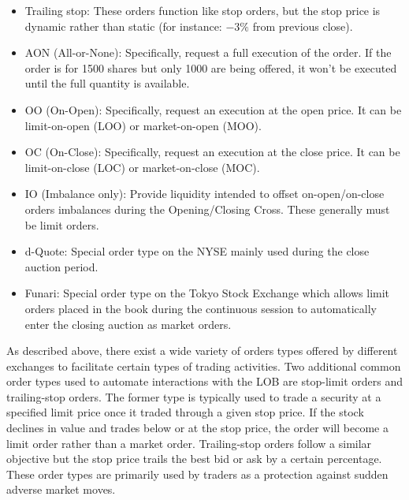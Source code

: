 \begin{itemize}
\item  Trailing stop: These orders function like stop orders, but the stop price is dynamic rather than static (for instance: $-3\%$ from previous close).

\item  AON (All-or-None): Specifically, request a full execution of the order. If the order is for 1500 shares but only 1000 are being offered, it won't be executed until the full quantity is available.

\item  OO (On-Open): Specifically, request an execution at the open price. It can be limit-on-open (LOO) or market-on-open (MOO).

\item  OC (On-Close): Specifically, request an execution at the close price. It can be limit-on-close (LOC) or market-on-close (MOC).

\item  IO (Imbalance only): Provide liquidity intended to offset on-open/on-close orders imbalances during the Opening/Closing Cross. These generally must be limit orders.

\item  d-Quote: Special order type on the NYSE mainly used during the close auction period.

\item  Funari: Special order type on the Tokyo Stock Exchange which allows limit orders placed in the book during the continuous session to automatically enter the closing auction as market orders. \\
\end{itemize} 




As described above, there exist a wide variety of orders types offered by different exchanges to facilitate certain types of trading activities. Two additional common order types used to automate interactions with the LOB are stop-limit orders and trailing-stop orders. The former type is typically used to trade a security at a specified limit price once it traded through a given stop price. If the stock declines in value and trades below or at the stop price, the order will become a limit order rather than a market order. Trailing-stop orders follow a similar objective but the stop price trails the best bid or ask by a certain percentage. These order types are primarily used by traders as a protection against sudden adverse market moves. \\


